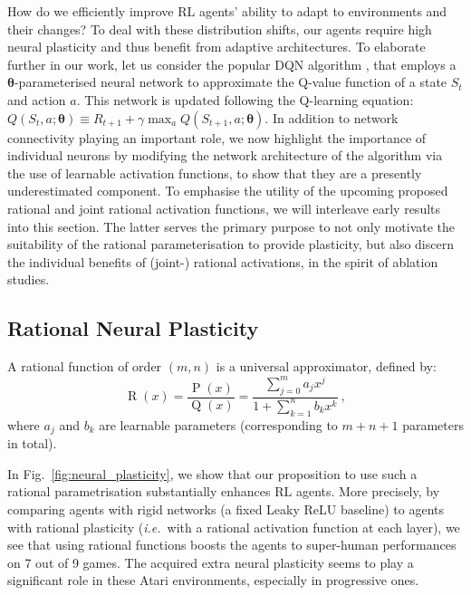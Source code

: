 \documentclass[accepted]{article}
\theoremstyle{plain}
\theoremstyle{definition}
\theoremstyle{remark}
\newcommand{\ie}{\emph{i.e.}~}
\begin{document}
How do we efficiently improve RL agents' ability to adapt to environments and their changes? To deal with these distribution shifts, our agents require high neural plasticity and thus benefit from adaptive architectures. To elaborate further in our work, let us consider the popular DQN algorithm \citep{mnih2015human}, that employs a $\boldsymbol{\theta}$-parameterised neural network to approximate the Q-value function of a state $S_t$ and action $a$. This network is updated following the Q-learning equation:
$Q\left(S_{t}, a ; \boldsymbol{\theta}\right) \equiv R_{t+1}+\gamma \max _{a} Q\left(S_{t+1}, a ; \boldsymbol{\theta}\right) $. In addition to network connectivity playing an important role, we now highlight the importance of individual neurons by modifying the network architecture of the algorithm via the use of learnable activation functions, to show that they are a presently underestimated component. To emphasise the utility of the upcoming proposed rational and joint rational activation functions, we will interleave early results into this section. The latter serves the primary purpose to not only motivate the suitability of the rational parameterisation to provide plasticity, but also discern the individual benefits of (joint-) rational activations, in the spirit of ablation studies.

\subsection{Rational Neural Plasticity}
A rational function of order $(m,n)$ is a universal approximator, defined by:
\begin{equation}
    \operatorname{R}(x)=\frac{\operatorname{P}(x)}{\operatorname{Q}(x)}=\frac{\sum_{j=0}^{m} a_{j} x^{j}}{1 + \sum_{k=1}^{n} b_{k} x^{k}} \ ,
    \label{eq:rf}
\end{equation}
where $a_j$ and $b_k$ are learnable parameters (corresponding to $m\! +\! n\! +\! 1$ parameters in total).

In Fig.~\ref{fig:neural_plasticity}, we show that our proposition to use such a rational parametrisation substantially enhances RL agents. 
More precisely, by comparing agents with rigid networks (a fixed Leaky ReLU baseline) to agents with rational plasticity (\ie with a rational activation function at each layer), we see that using rational functions boosts the agents to super-human performances on 7 out of 9 games. The acquired extra neural plasticity seems to play a significant role in these Atari environments, especially in progressive ones.
\end{document}
